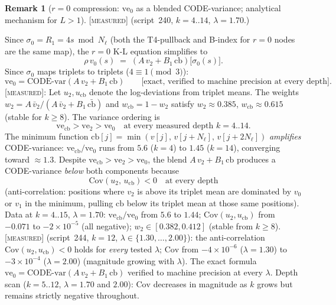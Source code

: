 \documentclass[11pt]{article}
\theoremstyle{definition}
\newtheorem{remark}[theorem]{Remark}
\newcommand{\MEASURED}{\textup{[\textsc{measured}]}}
\begin{document}
\begin{remark}[$r{=}0$ compression: $\mathrm{ve}_0$ as a blended CODE-variance;
analytical mechanism for $L>1$]\label{rem:ve0_blend}
\MEASURED{} (script~240, $k{=}4..14$, $\lambda{=}1.70$.)

\textup{Since $\sigma_0 = R_1 = 4s \bmod N_\ell$ (both the T4-pullback and B-index for $r{=}0$ nodes
are the same map), the $r{=}0$ K-L equation simplifies to}
\begin{equation}\label{eq:v0blend}
  \rho\,v_0(s) \;=\; (A\,v_2 + B_1\,\mathrm{cb})\bigl[\sigma_0(s)\bigr].
\end{equation}
Since $\sigma_0$ maps triplets to triplets ($4\equiv 1\pmod3$):
\begin{equation}\label{eq:ve0exact}
  \mathrm{ve}_0 = \mathrm{CODE\text{-}var}(A\,v_2 + B_1\,\mathrm{cb}) \qquad
  \text{[exact, verified to machine precision at every depth]}.
\end{equation}
\MEASURED{}: Let $u_2, u_{\mathrm{cb}}$ denote the log-deviations from triplet means.
The weights $w_2 = A\,\bar v_2/(A\,\bar v_2 + B_1\,\bar{\mathrm{cb}})$
and $w_{\mathrm{cb}} = 1 - w_2$ satisfy $w_2 \approx 0.385$, $w_{\mathrm{cb}} \approx 0.615$
(stable for $k \ge 8$).
The variance ordering is
\[
  \mathrm{ve}_{\mathrm{cb}} > \mathrm{ve}_2 > \mathrm{ve}_0 \quad
  \text{at every measured depth } k=4..14.
\]
The minimum function $\mathrm{cb}[j] = \min(v[j],\,v[j{+}N_\ell],\,v[j{+}2N_\ell])$
\emph{amplifies} CODE-variance: $\mathrm{ve}_{\mathrm{cb}}/\mathrm{ve}_0$ runs from $5.6$ ($k{=}4$)
to $1.45$ ($k{=}14$), converging toward ${\approx}1.3$.
Despite $\mathrm{ve}_{\mathrm{cb}} > \mathrm{ve}_2 > \mathrm{ve}_0$, the blend $A\,v_2 + B_1\,\mathrm{cb}$
produces a CODE-variance \emph{below} both components because
\[
  \mathrm{Cov}(u_2,\, u_{\mathrm{cb}}) < 0 \quad \text{at every depth}
\]
(anti-correlation: positions where $v_2$ is above its triplet mean are dominated by $v_0$ or $v_1$
in the minimum, pulling $\mathrm{cb}$ below its triplet mean at those same positions).
Data at $k{=}4..15$, $\lambda{=}1.70$:
$\mathrm{ve}_{\mathrm{cb}}/\mathrm{ve}_0$ from $5.6$ to $1.44$;
$\mathrm{Cov}(u_2, u_{\mathrm{cb}})$ from $-0.071$ to $-2{\times}10^{-5}$ (all negative);
$w_2 \in [0.382, 0.412]$ (stable from $k\ge8$).
\MEASURED{} (script~244, $k{=}12$, $\lambda\in\{1.30,\ldots,2.00\}$): the anti-correlation
$\mathrm{Cov}(u_2, u_{\mathrm{cb}}) < 0$ holds for \emph{every} tested $\lambda$;
$\mathrm{Cov}$ from $-4{\times}10^{-6}$ ($\lambda{=}1.30$) to $-3{\times}10^{-4}$ ($\lambda{=}2.00$)
(magnitude growing with $\lambda$). The exact formula $\mathrm{ve}_0 =
\mathrm{CODE\text{-}var}(A\,v_2 + B_1\,\mathrm{cb})$ verified to machine precision at every $\lambda$.
Depth scan ($k{=}5..12$, $\lambda{=}1.70$ and $2.00$): $\mathrm{Cov}$ decreases in magnitude
as $k$ grows but remains strictly negative throughout.


\end{remark}
\end{document}
